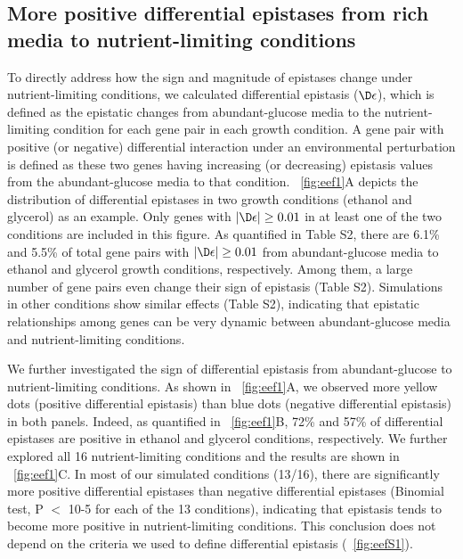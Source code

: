 \subsection{More positive differential epistases from rich media to
nutrient-limiting conditions}

To directly address how the sign and magnitude of epistases change
under nutrient-limiting conditions, we calculated differential
epistasis ($\D\epsilon$), which is defined as the epistatic changes from
abundant-glucose media to the nutrient-limiting condition for each
gene pair in each growth condition. A gene pair with positive (or
negative) differential interaction under an environmental perturbation
is defined as these two genes having increasing (or decreasing)
epistasis values from the abundant-glucose media to that
condition. \Fig~\ref{fig:eef1}A depicts the
distribution of differential
epistases in two growth conditions (ethanol and glycerol) as an
example. Only genes with $\left|\D\epsilon\right| \geq 0.01$ in at least
one of the two conditions are included in this figure. As quantified
in Table S2, there are 6.1\% and 5.5\% of total gene pairs with
$\left|\D\epsilon\right| \geq 0.01$ from abundant-glucose media to ethanol
and glycerol growth conditions, respectively. Among them, a large
number of gene pairs even change their sign of epistasis (Table
S2). Simulations in other conditions show similar effects (Table S2),
indicating that epistatic relationships among genes can be very
dynamic between abundant-glucose media and nutrient-limiting
conditions.


We further investigated the sign of differential epistasis from
abundant-glucose to nutrient-limiting conditions. As shown in \Fig~\ref{fig:eef1}A, 
we observed more yellow dots (positive differential epistasis)
than blue dots (negative differential epistasis) in both
panels. Indeed, as quantified in \Fig~\ref{fig:eef1}B, 72\% and 57\% of
differential epistases are positive in ethanol and glycerol
conditions, respectively. We further explored all 16 nutrient-limiting
conditions and the results are shown in \Fig~\ref{fig:eef1}C. In most of our
simulated conditions (13/16), there are significantly more positive
differential epistases than negative differential epistases (Binomial
test, P $<$ 10-5 for each of the 13 conditions), indicating that
epistasis tends to become more positive in nutrient-limiting
conditions. This conclusion does not depend on the criteria we used to
define differential epistasis (\Fig~\ref{fig:eefS1}).

